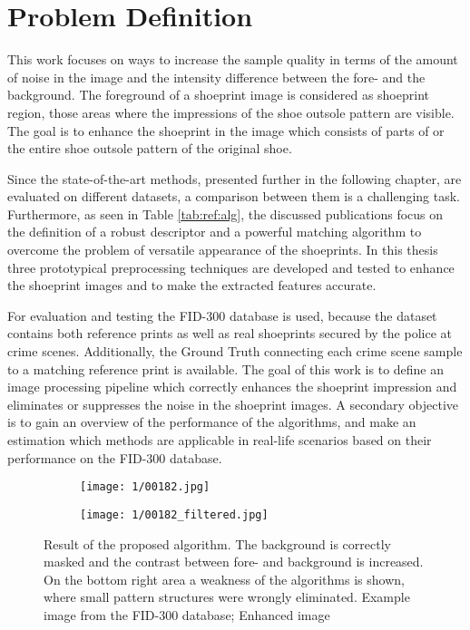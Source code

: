 \documentclass[draft,final]{vutinfth} %
\begin{document}
\section{Problem Definition}
\par
This work focuses on ways to increase the sample quality in terms of the amount of noise in the image and the intensity difference between the fore- and the background.
The foreground of a shoeprint image is considered as shoeprint region, those areas where the impressions of the shoe outsole pattern are visible.
The goal is to enhance the shoeprint in the image which consists of parts of or the entire shoe outsole pattern of the original shoe.   
\par
Since the state-of-the-art methods, presented further in the following chapter, are evaluated on different datasets, a comparison between them is a challenging task.
Furthermore, as seen in Table \ref{tab:ref:alg}, the discussed publications focus on the definition of a robust descriptor and a powerful matching algorithm to overcome the problem of versatile appearance of the shoeprints.
In this thesis three prototypical preprocessing techniques are developed and tested to enhance the shoeprint images and to make the extracted features accurate. 
\par
For evaluation and testing the FID-300 database is used, because the dataset contains both reference prints as well as real shoeprints secured by the police at crime scenes.
Additionally, the Ground Truth connecting each crime scene sample to a matching reference print is available.
The goal of this work is to define an image processing pipeline which correctly enhances the shoeprint impression and eliminates or suppresses the noise in the shoeprint images.
A secondary objective is to gain an overview of the performance of the algorithms, and make an estimation which methods are applicable in real-life scenarios based on their performance on the FID-300 database. 

\begin{figure}[h]
  \centering
  \begin{subfigure}[t]{0.45\columnwidth}
    \centering
    \texttt{[image: 1/00182.jpg]}
    \subcaption{}
    \label{fig:intro:orig}
  \end{subfigure}
  \begin{subfigure}[t]{0.45\columnwidth}
    \centering
    \texttt{[image: 1/00182\_filtered.jpg]}
    \subcaption{}
    \label{fig:intro:enhanced}
  \end{subfigure}
  \caption{Result of the proposed algorithm. The background is correctly masked and the contrast between fore- and background is increased. On the bottom right area a weakness of the algorithms is shown, where small pattern structures were wrongly eliminated.  Example image from the FID-300 database;  Enhanced image}
  \label{fig:example}
\end{figure}
\end{document}
